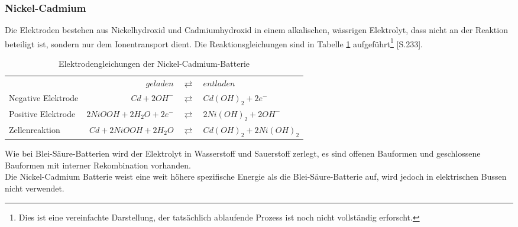 \subsubsection{Nickel-Cadmium}
Die Elektroden bestehen aus Nickelhydroxid und Cadmiumhydroxid in einem alkalischen, wässrigen Elektrolyt, dass nicht an der Reaktion beteiligt ist, sondern nur dem Ionentransport dient. Die Reaktionsgleichungen sind in Tabelle \ref{NiCd} aufgeführt\footnote{Dies ist eine vereinfachte Darstellung, der tatsächlich ablaufende Prozess ist noch nicht vollständig erforscht.} \cite{Sterner:2014}[S.233].\\
\begin{table}\centering
  \begin{tabularx}{\linewidth}{XrcX}
  	                   &               $geladen$ & $\rightleftarrows$ & $entladen$             \\
  	Negative Elektrode &            $Cd + 2OH^-$ & $\rightleftarrows$ & $Cd(OH)_2 + 2e^-$      \\
  	Positive Elektrode & $2NiOOH + 2H_2O + 2e^-$ & $\rightleftarrows$ & $2Ni(OH)_2 + 2OH^-$    \\ \midrule
  	Zellenreaktion     &   $Cd + 2NiOOH + 2H_2O$ & $\rightleftarrows$ & $Cd(OH)_2 + 2Ni(OH)_2$ \\
  \end{tabularx}
  \caption{Elektrodengleichungen der Nickel-Cadmium-Batterie}
  \label{NiCd}
\end{table}
Wie bei Blei-Säure-Batterien wird der Elektrolyt in Wasserstoff und Sauerstoff zerlegt, es sind offenen Bauformen und geschlossene Bauformen mit interner Rekombination vorhanden.\\
Die Nickel-Cadmium Batterie weist eine weit höhere spezifische Energie als die Blei-Säure-Batterie auf, wird jedoch in elektrischen Bussen nicht verwendet.

